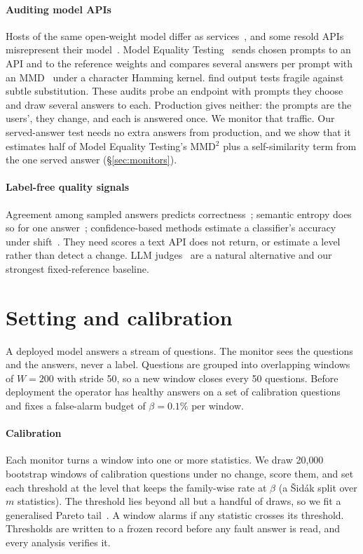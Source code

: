 \documentclass{article}
\begin{document}
\paragraph{Auditing model APIs}
Hosts of the same open-weight model differ as services~\citep{li2026sameservice},
and some resold APIs misrepresent their model~\citep{zhang2026shadow}. Model
Equality Testing~\citep{gao2025model} sends chosen prompts to an API and to the
reference weights and compares several answers per prompt with an
MMD~\citep{gretton2012kernel} under a character Hamming kernel.
\citet{cai2025substitution} find output tests fragile against subtle substitution.
These audits probe an endpoint with prompts they choose and draw several answers
to each. Production gives neither: the prompts are the users', they change, and
each is answered once. We monitor that traffic. Our served-answer test needs no
extra answers from production, and we show that it estimates half of Model
Equality Testing's MMD$^2$ plus a self-similarity term from the one served answer
(\S\ref{sec:monitors}).

\paragraph{Label-free quality signals}
Agreement among sampled answers predicts correctness~\citep{wang2023selfconsistency,
manakul2023selfcheckgpt}; semantic entropy does so for one
answer~\citep{kuhn2023semantic}; confidence-based methods estimate a classifier's
accuracy under shift~\citep{garg2022atc,deng2021labels}. They need scores a text
API does not return, or estimate a level rather than detect a change. LLM
judges~\citep{zheng2023judging} are a natural alternative and our strongest
fixed-reference baseline.

\section{Setting and calibration}
\label{sec:method}

A deployed model answers a stream of questions. The monitor sees the questions and
the answers, never a label. Questions are grouped into overlapping windows of
$W=200$ with stride 50, so a new window closes every 50 questions. Before
deployment the operator has healthy answers on a set of calibration questions and
fixes a false-alarm budget of $\beta=0.1\%$ per window.

\paragraph{Calibration} Each monitor turns a window into one or more statistics. We
draw 20{,}000 bootstrap windows of calibration questions under no change, score
them, and set each threshold at the level that keeps the family-wise rate at
$\beta$ (a Šidák split over $m$ statistics). The threshold lies beyond all but a
handful of draws, so we fit a generalised Pareto tail~\citep{pickands1975statistical}.
A window alarms if any statistic crosses its threshold. Thresholds are written to a
frozen record before any fault answer is read, and every analysis verifies it.
\end{document}
